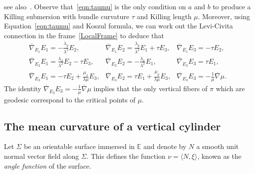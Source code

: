 \documentclass[a4paper,10pt,reqno]{amsart}
\newcommand{\E}{\mathbb{E}}
\theoremstyle{definition}
\theoremstyle{remark}
\numberwithin{equation}{section}
\begin{document}
see also~\cite[Eq.\ (2.5)]{LerMan}. Observe that~\eqref{eqn:taumu} is the only condition on $a$ and $b$ to produce a Killing submersion with bundle curvature $\tau$ and Killing length $\mu$. Moreover, using Equation~\eqref{eqn:taumu} and Koszul formula, we can work out the Levi-Civita connection in the frame~\eqref{LocalFrame} to deduce that
\begin{equation}\label{LeviCivitaConnection}
	\begin{array}{lll}
		\overline\nabla_{E_1}E_1=-\frac{\lambda_y}{\lambda^2}E_2, &\overline\nabla_{E_1}E_2=\frac{\lambda_y}{\lambda^2}E_1+\tau E_3, &\overline\nabla_{E_1}E_3=-\tau E_2, \\
		\overline\nabla_{E_2}E_1=\frac{\lambda_x}{\lambda^2}E_2-\tau E_3, &\overline\nabla_{E_2}E_2=-\frac{\lambda_x}{\lambda^2}E_1, &\overline\nabla_{E_2}E_3=\tau E_1, \\
		\overline\nabla_{E_3}E_1=-\tau E_2+\frac{\mu_x}{\lambda\mu}E_3, &\overline\nabla_{E_3}E_2=\tau E_1+\frac{\mu_y}{\lambda\mu}E_3, & \overline\nabla_{E_3}E_3=-\frac{1}{\mu}\overline\nabla\mu.
	\end{array}
\end{equation}
The identity $\overline\nabla_{E_3}E_3=-\frac{1}{\mu}\overline\nabla\mu$ implies that the only vertical fibers of $\pi$ which are geodesic correspond to the critical points of $\mu$.
			
			
\subsection{The mean curvature of a vertical cylinder}
Let $\Sigma$ be an orientable surface immersed in $\E$ and denote by $N$ a smooth unit normal vector field along $\Sigma$. This defines the function $\nu=\langle N,\xi\rangle$, known as the \emph{angle function} of the surface. 
\end{document}
